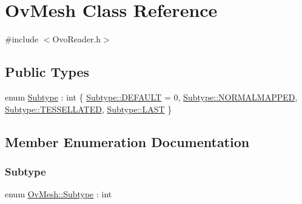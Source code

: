 \hypertarget{classOvMesh}{}\section{Ov\+Mesh Class Reference}
\label{classOvMesh}


{\ttfamily \#include $<$Ovo\+Reader.\+h$>$}

\subsection*{Public Types}
\begin{DoxyCompactItemize}
\item 
enum \hyperlink{classOvMesh_a2c6403d2084eb117bd2081e8e3b31d10}{Subtype} \+: int \{ \hyperlink{classOvMesh_a2c6403d2084eb117bd2081e8e3b31d10a5b39c8b553c821e7cddc6da64b5bd2ee}{Subtype\+::\+D\+E\+F\+A\+U\+LT} = 0, 
\hyperlink{classOvMesh_a2c6403d2084eb117bd2081e8e3b31d10ad6710d6c7ec010e7a3d16901c245071a}{Subtype\+::\+N\+O\+R\+M\+A\+L\+M\+A\+P\+P\+ED}, 
\hyperlink{classOvMesh_a2c6403d2084eb117bd2081e8e3b31d10a187d7360a001dce0e4e78e1cf7b7e882}{Subtype\+::\+T\+E\+S\+S\+E\+L\+L\+A\+T\+ED}, 
\hyperlink{classOvMesh_a2c6403d2084eb117bd2081e8e3b31d10af447f5c03508de4d88e340390ba7c78f}{Subtype\+::\+L\+A\+ST}
 \}
\end{DoxyCompactItemize}


\subsection{Member Enumeration Documentation}
\mbox{\label{classOvMesh_a2c6403d2084eb117bd2081e8e3b31d10}} 
\subsubsection{\texorpdfstring{Subtype}{Subtype}}
{\footnotesize\ttfamily enum \hyperlink{classOvMesh_a2c6403d2084eb117bd2081e8e3b31d10}{Ov\+Mesh\+::\+Subtype} \+: int\hspace{0.3cm}{\ttfamily [strong]}}


